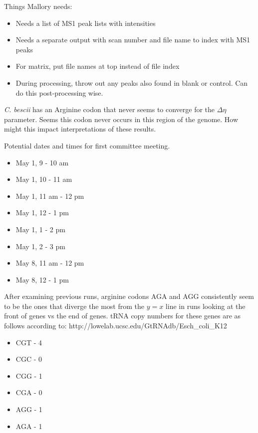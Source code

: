 \documentclass[11pt]{labbook}
\begin{document}

Things Mallory needs:
\begin{itemize}
\item Needs a list of MS1 peak lists with intensities
\item Needs a separate output with scan number and file name to index with MS1 peaks
\item For matrix, put file names at top instead of file index
\item During processing, throw out any peaks also found in blank or control. Can do this post-processing wise. 
\end{itemize}

\textit{C. bescii} has an Arginine codon that never seems to converge for the $\Delta\eta$ parameter. Seems this codon never occurs in this region of the genome. How might this impact interpretations of these results. 

Potential dates and times for first committee meeting.

\begin{itemize}
\item May 1, 9 - 10 am
\item May 1, 10 - 11 am
\item May 1, 11 am - 12 pm
\item May 1, 12 - 1 pm
\item May 1, 1 - 2 pm
\item May 1, 2 - 3 pm
\item May 8, 11 am - 12 pm
\item May 8, 12 - 1 pm
\end{itemize}

After examining previous runs, arginine codons AGA and AGG consistently seem to be the ones that diverge the most from the $y = x$ line in runs looking at the front of genes vs the end of genes. tRNA copy numbers for these genes are as follows according to: \newline http://lowelab.ucsc.edu/GtRNAdb/Esch\_coli\_K12

\begin{itemize}
\item CGT - 4 
\item CGC - 0
\item CGG - 1
\item CGA - 0
\item AGG - 1
\item AGA - 1
\end{itemize}
\end{document}
